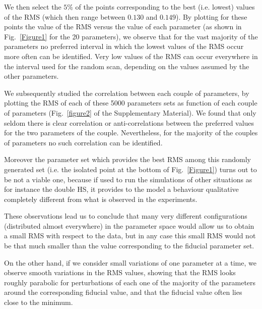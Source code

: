 \documentclass[oneside, 10pt, a4paper, twocolumn]{article}
\begin{document}
We then select the $5\%$ of the points corresponding to the best (i.e. lowest) values of the RMS (which then range between $0.130$ and $0.149$). 
By plotting for these points the value of the RMS versus the value of each parameter (as shown in Fig.~\ref{Figure1} for the 20 parameters), we observe that for the vast majority of the parameters no preferred interval in which the lowest values of the RMS occur more often can be identified. Very low values of the RMS can occur everywhere in the interval used for the random scan, depending on the values assumed by the other parameters. 

We subsequently studied the correlation between each couple of parameters, by plotting the RMS of each of these 5000 parameters sets as function of each couple of parameters (Fig.~\ref{figure2} of the Supplementary Material). We found that only seldom there is clear correlation or anti-correlations between the preferred values for the two parameters of the couple. Nevertheless, for the majority of the couples of parameters no such correlation can be identified. 

Moreover the parameter set which provides the best RMS among this randomly generated set (i.e. the isolated point at the bottom of Fig.~\ref{Figure1}) turns out to be not a viable one, because if used to run the simulations of other situations as for instance the double HS, it provides to the model a behaviour qualitative completely different from what is observed in the experiments.

These observations lead us to conclude that many very different configurations (distributed almost everywhere) in the parameter space would allow us to obtain a small RMS with respect to the data, but in any case this small RMS would not be that much smaller than the value corresponding to the fiducial parameter set.

On the other hand, if we consider small variations of one parameter at a time, we observe smooth variations in the RMS values, showing that the RMS looks roughly parabolic for perturbations of each one of the majority of the parameters around the corresponding fiducial value, and that the fiducial value often lies close to the minimum.

\end{document}
